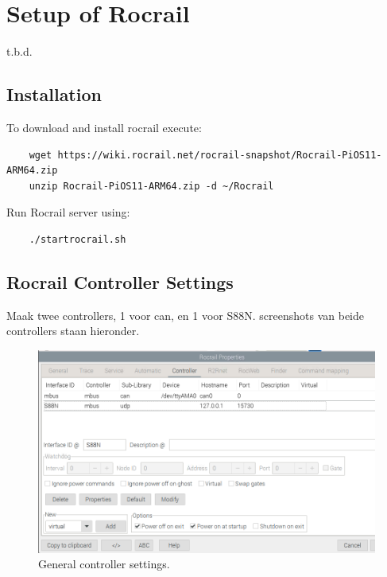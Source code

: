 \section{Setup of Rocrail}
t.b.d.

\subsection{Installation}
To download and install rocrail execute:

\begin{verbatim}
	wget https://wiki.rocrail.net/rocrail-snapshot/Rocrail-PiOS11-ARM64.zip
	unzip Rocrail-PiOS11-ARM64.zip -d ~/Rocrail
\end{verbatim}

Run Rocrail server using:

\begin{verbatim}
	./startrocrail.sh
\end{verbatim}

\subsection{Rocrail Controller Settings}

Maak twee controllers, 1 voor can, en 1 voor S88N. screenshots van beide controllers staan hieronder.

\begin{figure}[h!]
	\centering
	\includegraphics[width=1.00\linewidth]{../figures/rocrailcontrollersettings/rocrail_controller_mbus_S88n.png}
	\caption{General controller settings.}
	\label{rocrail_controller_mbus_S88n}
\end{figure}

